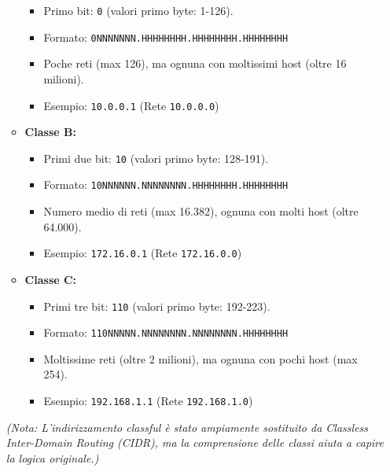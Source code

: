 \begin{itemize}
\begin{itemize}
        \begin{itemize}
            \item Primo bit: \texttt{0} (valori primo byte: 1-126).
            \item Formato: \texttt{0NNNNNNN.HHHHHHHH.HHHHHHHH.HHHHHHHH}
            \item Poche reti (max 126), ma ognuna con moltissimi host (oltre 16 milioni).
            \item Esempio: \texttt{10.0.0.1} (Rete \texttt{10.0.0.0})
        \end{itemize}
        \item \textbf{Classe B:}
        \begin{itemize}
            \item Primi due bit: \texttt{10} (valori primo byte: 128-191).
            \item Formato: \texttt{10NNNNNN.NNNNNNNN.HHHHHHHH.HHHHHHHH}
            \item Numero medio di reti (max 16.382), ognuna con molti host (oltre 64.000).
            \item Esempio: \texttt{172.16.0.1} (Rete \texttt{172.16.0.0})
        \end{itemize}
        \item \textbf{Classe C:}
        \begin{itemize}
            \item Primi tre bit: \texttt{110} (valori primo byte: 192-223).
            \item Formato: \texttt{110NNNNN.NNNNNNNN.NNNNNNNN.HHHHHHHH}
            \item Moltissime reti (oltre 2 milioni), ma ognuna con pochi host (max 254).
            \item Esempio: \texttt{192.168.1.1} (Rete \texttt{192.168.1.0})
        \end{itemize}
    \end{itemize}
    \textit{(Nota: L'indirizzamento classful è stato ampiamente sostituito da Classless Inter-Domain Routing (CIDR), ma la comprensione delle classi aiuta a capire la logica originale.)}
\end{itemize}

